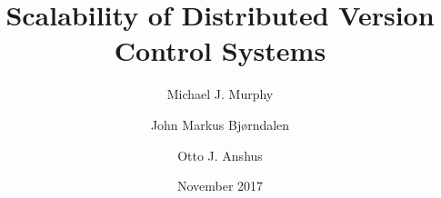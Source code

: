 \documentclass[
    usenglish,
    final,
]{nik}
\title{Scalability of Distributed Version Control Systems}
\author{
    Michael J. Murphy
    \and John Markus Bjørndalen
    \and Otto J. Anshus
}
\date{November 2017}
\begin{document}
\maketitle

\begin{abstract}

\end{abstract}










\printbibliography[]

\listoftodos

\ifoptionfinal{}{
    
}
\end{document}

